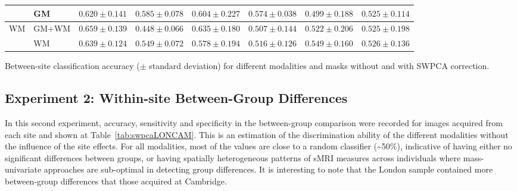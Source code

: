 \begin{bigtable}
\begin{tabularx}{\linewidth}{ll|XX|XX|XX}
		&	GM &	$ 0.620 \pm 0.141 $ & $ 0.585 \pm 0.078 $ & $ 0.604 \pm 0.227 $ & $ 0.574 \pm 0.038 $  &	$ 0.499 \pm 0.188 $ &  $ 0.525 \pm 0.114 $ \\
		\midrule
		\multirow{2}{*}{\ac{WM}} &GM+WM &	$ 0.659 \pm 0.139 $ & $ 0.448 \pm 0.066 $ & $ 0.635 \pm 0.180 $ & $ 0.507 \pm 0.144 $  &	$ 0.522 \pm 0.206 $  & $ 0.525 \pm 0.198 $ \\
		&	WM & $ 0.639 \pm 0.124 $ & $ 0.549 \pm 0.072 $ & $ 0.578 \pm 0.194 $ & $ 0.516 \pm 0.126 $  & 	$ 0.549 \pm 0.160 $ &  $ 0.526 \pm 0.136 $ \\
		\bottomrule
	\end{tabularx}
	\caption[Between-site classification accuracy ($\pm$ standard deviation) for
	different modalities and masks without and with \acs{SWPCA} correction.]{Between-site classification accuracy ($\pm$ standard deviation) for different modalities and masks without and with \ac{SWPCA} correction.}
	\label{tab:swpcaAqSite}
\end{bigtable}

\subsection{Experiment 2: Within-site Between-Group Differences}\label{sec:swpcaE2}
In this second experiment, accuracy, sensitivity and specificity in the be\-tween-group comparison were recorded for images acquired from each site and shown at Table~\ref{tab:swpcaLONCAM}. This is an estimation of the discrimination ability of the different modalities without the influence of the site effects. For all modalities, most of the values are close to a random classifier (\~{}50\%), indicative of having either no significant differences between groups, or having spatially heterogeneous patterns of s\ac{MRI} measures across individuals where mass-univariate approaches are sub-optimal in detecting group differences. It is interesting to note that the London sample contained more between-group differences that those acquired at Cambridge. 

